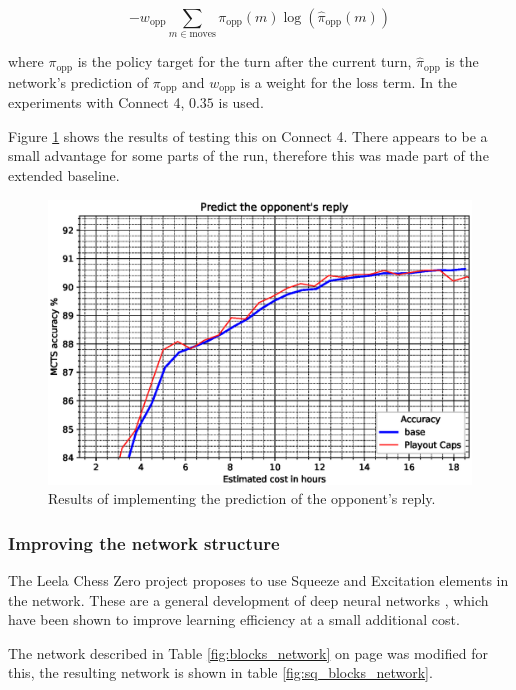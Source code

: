 \documentclass[12pt,onecolumn,oneside,titlepage]{article}
\begin{document}
\begin{equation}
 -w_{\text{opp}} \sum\limits_{m \in \text{moves}} \pi_{\text{opp}}(m) \log(\hat{\pi}_{\text{opp}}(m)) \label{eq:opp_reply}
\end{equation}

where $\pi_{\text{opp}}$ is the policy target for the turn after the current turn, $\hat{\pi}_{\text{opp}}$ is the network's prediction of $\pi_{\text{opp}}$ and $w_{\text{opp}}$ is a weight for the loss term. In the experiments with Connect 4, $0.35$ is used.

Figure \ref{fig:predict_reply} shows the results of testing this on Connect 4. There appears to be a small advantage for some parts of the run, therefore this was made part of the extended baseline.

\begin{figure}[H]
\centering
\includegraphics[clip,width=\columnwidth]{predict_reply}
\caption{Results of implementing the prediction of the opponent's reply.}
\label{fig:predict_reply}
\end{figure}


\subsubsection{Improving the network structure}

The Leela Chess Zero project \cite{leela0sq} proposes to use Squeeze and Excitation elements in the network.
These are a general development of deep neural networks  \cite{hu2018squeeze}, which have been shown to improve learning efficiency at a small additional cost.

The network described in Table \ref{fig:blocks_network} on page \pageref{fig:blocks_network} was modified for this, the resulting network is shown in table \ref{fig:sq_blocks_network}.
\end{document}
